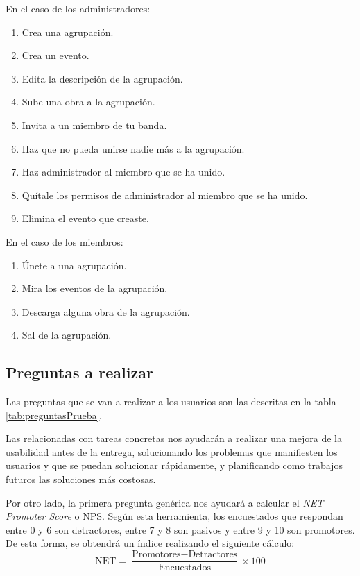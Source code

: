 En el caso de los administradores:

\begin{enumerate}
    \item Crea una agrupación.
    \item Crea un evento.
    \item Edita la descripción de la agrupación.
    \item Sube una obra a la agrupación.
    \item Invita a un miembro de tu banda.
    \item Haz que no pueda unirse nadie más a la agrupación.
    \item Haz administrador al miembro que se ha unido.
    \item Quítale los permisos de administrador al miembro que se ha unido.
    \item Elimina el evento que creaste.
\end{enumerate}

En el caso de los miembros:

\begin{enumerate}
    \item Únete a una agrupación.
    \item Mira los eventos de la agrupación.
    \item Descarga alguna obra de la agrupación.
    \item Sal de la agrupación.
\end{enumerate}


\subsection{Preguntas a realizar}

Las preguntas que se van a realizar a los usuarios son las descritas en la tabla \ref{tab:preguntasPrueba}.

Las relacionadas con tareas concretas nos ayudarán a realizar una mejora de la usabilidad antes de la entrega, solucionando los problemas que manifiesten los usuarios y que se puedan solucionar rápidamente, y planificando como trabajos futuros las soluciones más costosas.

Por otro lado, la primera pregunta genérica nos ayudará a calcular el \textit{NET Promoter Score} o NPS. Según esta herramienta, los encuestados que respondan entre 0 y 6 son detractores, entre 7 y 8 son pasivos y entre 9 y 10 son promotores. De esta forma, se obtendrá un índice realizando el siguiente cálculo:
\[
\textrm{NET} = \frac{\textrm{Promotores} - \textrm{Detractores}}{\textrm{Encuestados}} \times 100
\]

